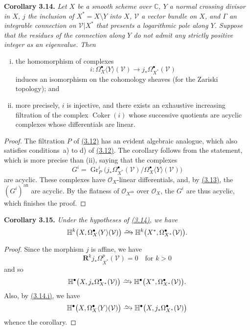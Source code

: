 \documentclass{report}
\newenvironment{itenv}[1]
  {\phantomsection\par\medskip\noindent\textbf{#1.}\itshape}
  {\par\medskip}
\renewcommand{\cal}[1]{{\mathcal{#1}}}
\newcommand{\CC}{\mathbb{C}}
\newcommand{\RR}{\mathbf{R}}
\newcommand{\an}{\mathrm{an}}
\newcommand{\simto}{\xrightarrow{\raisebox{-0.7ex}[0ex][0ex]{$\sim$}}}
\DeclareMathOperator{\Coker}{Coker}
\DeclareMathOperator{\Gr}{Gr}
\newcommand{\oldpage}[1]{\marginpar{\footnotesize$\Big\vert$ \textit{p.~#1}}}
\begin{document}
\begin{itenv}{Corollary 3.14}
\label{II.3.14}
  Let $X$ be a smooth scheme over $\CC$, $Y$ a normal crossing divisor in $X$, $j$ the inclusion of $X^*=X\setminus Y$ into $X$, $\cal{V}$ a vector bundle on $X$, and $\Gamma$ an integrable connection on $\cal{V}|X^*$ that presents a logarithmic pole along $Y$.
  Suppose that the residues of the connection along $Y$ do not admit any strictly positive integer as an eigenvalue.
  Then
  \begin{enumerate}[(i)]
    \item the homomorphism of complexes
      \[
        i\colon \Omega_X^\bullet\langle Y\rangle(\cal{V}) \to j_*\Omega_{X^*}^\bullet(\cal{V})
      \]
      induces an isomorphism on the cohomology sheaves (for the Zariski topology); and
    \item more precisely, $i$ is injective, and there exists an exhaustive increasing filtration of the complex $\Coker(i)$ whose successive quotients are acyclic complexes whose differentials are linear.
  \end{enumerate}
\end{itenv}

\begin{proof}
  The filtration $P$ of \hyperref[II.3.12]{(3.12)} has an evident algebraic analogue, which also satisfies conditions~a) to d) of \hyperref[II.3.12]{(3.12)}.
  The corollary follows from the statement, which is more precise than (ii), saying that the complexes
  \[
    G^i = \Gr^i_P\big(j_*\Omega_{X^*}^\bullet(\cal{V})\big/\Omega_X^\bullet\langle Y\rangle(\cal{V})\big)
  \]
  are acyclic.
  These complexes have $\cal{O}_X$-linear differentials, and, by \hyperref[II.3.13]{(3.13)},
\oldpage{85}
  the $(G^i)^\an$ are acyclic.
  By the flatness of $\cal{O}_{X^\an}$ over $\cal{O}_X$, the $G^i$ are thus acyclic, which finishes the proof.
\end{proof}

\begin{itenv}{Corollary 3.15}
\label{II.3.15}
  Under the hypotheses of \hyperref[II.3.14]{(3.14)}, we have
  \[
    \mathbb{H}^k\big(X,\Omega_X^\bullet\langle Y\rangle(\cal{V})\big)
    \simto \mathbb{H}^k\big(X^*,\Omega_{X^*}^\bullet(\cal{V})\big).
  \]
\end{itenv}

\begin{proof}
  Since the morphism $j$ is affine, we have
  \[
    \RR^kj_*\Omega_{X^*}^p(\cal{V})=0
    \quad\mbox{for $k>0$}
  \]
  and so
  \[
    \mathbb{H}^\bullet\big(X,j_*\Omega_{X^*}^\bullet(\cal{V})\big)
    \simto \mathbb{H}^\bullet\big(X^*,\Omega_{X^*}^\bullet(\cal{V})\big).
  \]
  Also, by \hyperref[II.3.14]{(3.14.i)}, we have
  \[
    \mathbb{H}^\bullet\big(X,\Omega_X^\bullet\langle Y\rangle(\cal{V})\big)
    \simto \mathbb{H}^\bullet\big(X,j_*\Omega_{X^*}^\bullet(\cal{V})\big)
  \]
  whence the corollary.
\end{proof}
\end{document}

